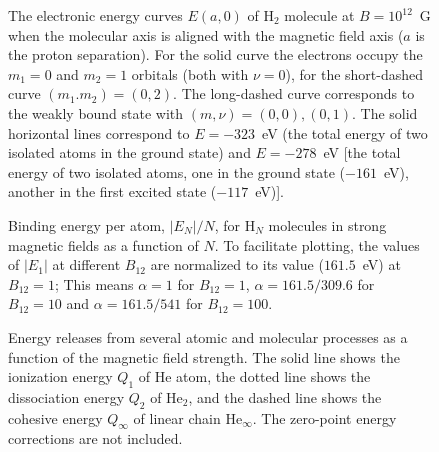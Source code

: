 \begin{figure}[t]
\vspace*{50mm}
\caption{The electronic energy curves $E(a,0)$ of H$_2$ molecule 
at $B=10^{12}$~G when the molecular axis is aligned with 
the magnetic field axis ($a$ is the proton separation). 
For the solid curve the electrons occupy the 
$m_1=0$ and $m_2=1$ orbitals (both with $\nu=0$), for the short-dashed
curve $(m_1.m_2)=(0,2)$. The long-dashed curve corresponds to the weakly 
bound state with $(m,\nu)=(0,0),(0,1)$. The solid horizontal lines
correspond to $E=-323$~eV (the total energy of two isolated atoms in 
the ground state) and $E=-278$~eV [the total energy of two isolated
atoms, one in the ground state ($-161$~eV), another in the first excited
state ($-117$~eV)].
}
\end{figure}

\begin{figure}[t]
\vspace*{60mm}
\caption{Binding energy per atom, $|E_N|/N$, for H$_N$ molecules 
in strong magnetic fields as a function of $N$. To facilitate 
plotting, the values of $|E_1|$ at different $B_{12}$ are normalized to 
its value ($161.5$~eV) at $B_{12}=1$; This means $\alpha=1$ for 
$B_{12}=1$, $\alpha=161.5/309.6$ for $B_{12}=10$ and
$\alpha=161.5/541$ for $B_{12}=100$.
}
\end{figure}

\clearpage

\begin{figure}[t]
\vspace*{60mm}
\caption{Energy releases from several atomic and molecular processes as a
function of the magnetic field strength. The solid line shows the ionization
energy $Q_1$ of He atom, the dotted line shows the dissociation energy $Q_2$ of
He$_2$, and the dashed line shows the cohesive energy $Q_\infty$ of linear 
chain He$_\infty$. The zero-point energy corrections are not included.
}
\end{figure}

